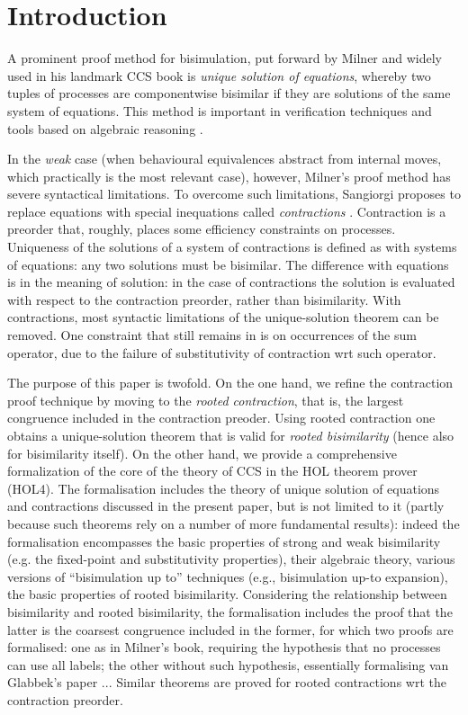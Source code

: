 \section{Introduction}

A prominent proof method for bisimulation, put forward by Milner and widely used in his
landmark CCS book \cite{Mil89} is
\emph{unique solution of equations}, whereby two tuples of processes are
componentwise bisimilar if they are solutions 
of the same system of equations.
This method  is important in verification techniques and tools
based on algebraic reasoning \cite{theoryAndPractice,RosUnder10,BaeBOOK}. 

In the   \emph{weak} case (when  behavioural equivalences abstract from internal moves,
which practically is the most relevant case), however, 
Milner's proof method has severe syntactical limitations. 
To overcome such limitations, Sangiorgi proposes to replace
equations with  special inequations called
\emph{contractions} \cite{...}. Contraction is a preorder that, roughly, places some efficiency
constraints on processes.  
Uniqueness of the solutions 
 of a system of contractions
 is defined as with systems of
equations:  
any two solutions must be bisimilar.
The difference with equations is in the meaning of solution:
in the case of contractions
the solution is evaluated with respect to
the contraction preorder, rather than bisimilarity. 
With contractions, most syntactic limitations of the unique-solution theorem can be
removed.  One constraint that still remains in \cite{San...} is on occurrences of the sum operator, due to
the failure of substitutivity of contraction wrt such operator.  

The purpose of this paper is twofold. 
On the one hand, we refine the contraction proof technique by moving to the 
\emph{rooted contraction}, that is, the largest congruence included in the contraction
preoder.  Using rooted contraction one obtains a unique-solution theorem that is valid for
\emph{rooted bisimilarity} (hence also for bisimilarity itself).  
On the other hand, we provide a  
 comprehensive formalization  of the core of the theory of CCS 
 in the HOL
theorem prover (HOL4). The formalisation  includes the theory of unique solution of equations and
contractions discussed in the present paper, but is not limited to it (partly because such
theorems rely on a number of more fundamental results):
indeed the formalisation encompasses the basic properties of strong and weak
bisimilarity (e.g. the fixed-point and substitutivity properties), 
their algebraic theory, 
 various
versions of ``bisimulation up to'' techniques (e.g., bisimulation up-to expansion),
the basic properties  of rooted bisimilarity. Considering the relationship between bisimilarity and rooted
bisimilarity, the formalisation includes the proof that the latter is the coarsest
congruence included in the former, for which two proofs are formalised: one as in Milner's
book,  requiring the hypothesis that  no processes can use all labels; the other without
such hypothesis, essentially formalising van Glabbek's paper ...
Similar theorems are proved for rooted contractions wrt the contraction preorder. 



